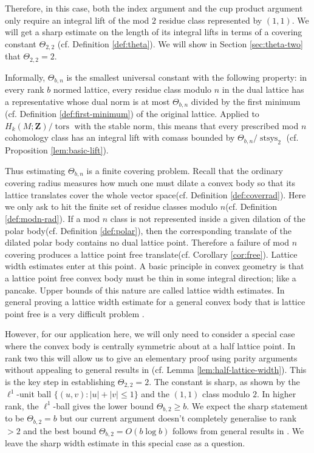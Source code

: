 \documentclass[11pt,reqno]{amsart}
\numberwithin{equation}{section}
\numberwithin{equation}{section}
\theoremstyle{definition}
\newcommand{\Z}{\mathbf Z}
\DeclareMathOperator{\stsys}{stsys}
\DeclareMathOperator{\tors}{tors}
\begin{document}
Therefore, in this case, both the index argument and the cup product argument only require an integral lift of the mod \(2\) residue class represented by \((1,1)\). We will get a sharp estimate on the length of its integral lifts in terms of a covering constant \(\Theta_{2,2}\) (cf. Definition \ref{def:theta}). We will show in Section \ref{sec:theta-two} that $\Theta_{2,2}=2$.

Informally, \(\Theta_{b,n}\) is the smallest universal constant with the following property: in every rank \(b\) normed lattice, every residue class modulo \(n\) in the dual lattice has a representative whose dual norm is at most \(\Theta_{b,n}\) divided by the first minimum (cf. Definition \ref{def:first-minimum}) of the original lattice. Applied to $H_k(M;\Z)/\tors$ with the stable norm, this means that every prescribed mod \(n\) cohomology class has an integral lift with comass bounded by $\Theta_{b,n}/\stsys_2$ (cf. Proposition \ref{lem:basic-lift}).

Thus estimating $\Theta_{b,n}$ is a finite covering problem. Recall that the ordinary covering radius measures how much one must dilate a convex body so that its lattice translates cover the whole vector space(cf. Definition \ref{def:coverrad}). Here we only ask to hit the finite set of residue classes modulo \(n\)(cf. Definition \ref{def:modn-rad}). If a mod \(n\) class is not represented inside a given dilation of the polar body(cf. Definition \ref{def:polar}), then the corresponding translate of the dilated polar body contains no dual lattice point. Therefore a failure of mod \(n\) covering produces a lattice point free translate(cf. Corollary \ref{cor:free}). Lattice width estimates enter at this point. A basic principle in convex geometry is that a lattice point free convex body must be thin in some integral direction; like a pancake. Upper bounds of this nature are called lattice width estimates. In general proving a lattice width estimate for a general convex body that is lattice point free is a very difficult problem \cite{KL88,Banaszczyk1,Banaszczyk2,aw12}. 

However, for our application here, we will only need to consider a special case where the convex body is centrally symmetric about at a half lattice point. In rank two this will allow us to give an elementary proof using parity arguments without appealing to general results in \cite{aw12} (cf. Lemma \ref{lem:half-lattice-width}). This is the key step in establishing \(\Theta_{2,2}=2\). The constant is sharp, as shown by the \(\ell^1\)-unit ball \(\{(u,v): |u|+|v|\le1\}\) and the \((1,1)\) class modulo \(2\). In higher rank, the \(\ell^1\)-ball gives the lower bound \(\Theta_{b,2}\ge b\). We expect the sharp statement to be \(\Theta_{b,2}=b\) but our current argument doesn't completely generalise to rank $>2$ and the best bound \(\Theta_{b,2}=O(b\log b)\) follows from general results in \cite{Banaszczyk2}.  We leave the sharp width estimate in this special case as a question. 
\end{document}
